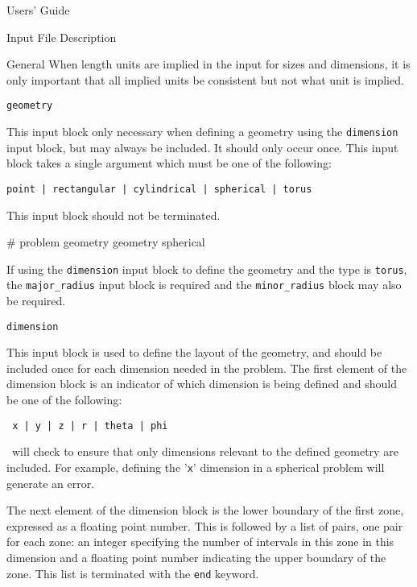 \begin{chapter}{Users' Guide\label{app:user.guide}}
\begin{section}{Input File Description\label{app:user.input}}
\begin{subsection}{General}
      When length units are implied in the input for sizes and
      dimensions, it is only important that all implied units be
      consistent but not what unit is implied.
    \end{subsection}
    
    \begin{subsection}{\texttt{geometry}\label{app:user.input.geom}}
    
      This input block only necessary when defining a geometry using
      the \texttt{dimension} input block, but may always be included.
      It should only occur once.  This input block takes a single
      argument which must be one of the following:
      \begin{center}
        \texttt{point | rectangular | cylindrical | spherical | torus}
      \end{center}
      This input block should not be terminated.

      \begin{center}
        \renewcommand{\baselinestretch}{1}\normalsize
        \begin{boxedverbatim}
# problem geometry
geometry spherical          
\end{boxedverbatim}
      \end{center}

      If using the \texttt{dimension} input block to define the
      geometry and the type is \texttt{torus}, the
      \texttt{major\_radius} input block is required and the
      \texttt{minor\_radius} block may also be required.
    \end{subsection}

    \begin{subsection}{\texttt{dimension}\label{app:user.input.dim}}
      
      This input block is used to define the layout of the geometry,
      and should be included once for each dimension needed in the
      problem.  The first element of the dimension block is an
      indicator of which dimension is being defined and should be one
      of the following:
      \begin{center}
        \texttt{ x | y | z | r | theta | phi }
      \end{center}
      \ALARA\ will check to ensure that only dimensions relevant to
      the defined geometry are included.  For example, defining the
      '\texttt{x}' dimension in a spherical problem will generate an
      error.

      The next element of the dimension block is the lower boundary of
      the first zone, expressed as a floating point number.  This is
      followed by a list of pairs, one pair for each zone: an integer
      specifying the number of intervals in this zone in this
      dimension and a floating point number indicating the upper
      boundary of the zone.  This list is terminated with the
      \texttt{end} keyword.
      

\end{subsection}
\end{section}
\end{chapter}
